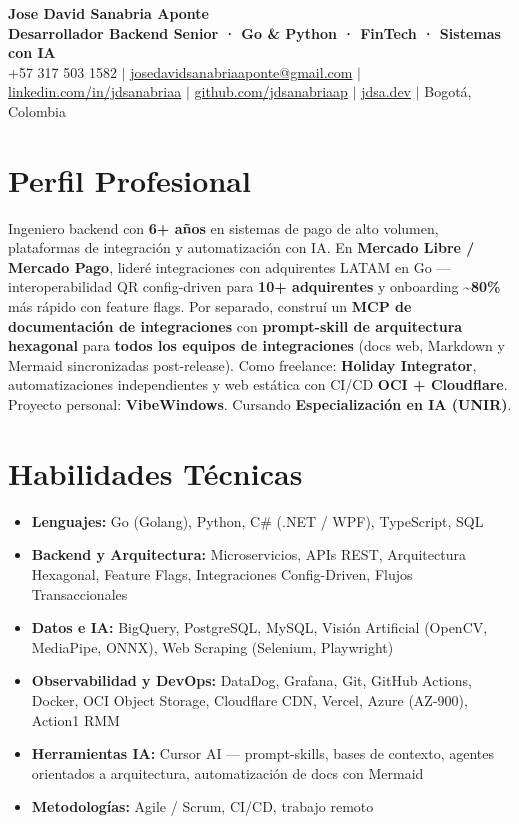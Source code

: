 
\begin{center}
  {\Huge \textbf{Jose David Sanabria Aponte}} \\[3pt]
  {\large \textcolor{accent}{\textbf{Desarrollador Backend Senior · Go \& Python · FinTech · Sistemas con IA}}} \\[4pt]
  \small
  +57 317 503 1582 \;$|$\;
  \href{mailto:josedavidsanabriaaponte@gmail.com}{josedavidsanabriaaponte@gmail.com} \;$|$\;
  \href{https://linkedin.com/in/jdsanabriaa}{linkedin.com/in/jdsanabriaa} \;$|$\;
  \href{https://github.com/jdsanabriaap}{github.com/jdsanabriaap} \;$|$\;
  \href{https://jdsa.dev}{jdsa.dev} \;$|$\;
  Bogotá, Colombia
\end{center}

\vspace{-4pt}

\section*{Perfil Profesional}

Ingeniero backend con \textbf{6+ años} en sistemas de pago de alto volumen, plataformas de integración
y automatización con IA. En \textbf{Mercado Libre / Mercado Pago}, lideré integraciones con adquirentes
LATAM en Go — interoperabilidad QR config-driven para \textbf{10+ adquirentes} y onboarding
\textbf{\textasciitilde{}80\%} más rápido con feature flags. Por separado, construí un \textbf{MCP de
documentación de integraciones} con \textbf{prompt-skill de arquitectura hexagonal} para \textbf{todos los
equipos de integraciones} (docs web, Markdown y Mermaid sincronizadas post-release). Como freelance:
\textbf{Holiday Integrator}, automatizaciones independientes y web estática con CI/CD \textbf{OCI +
Cloudflare}. Proyecto personal: \textbf{VibeWindows}. Cursando \textbf{Especialización en IA (UNIR)}.

\section*{Habilidades Técnicas}

\begin{itemize}
  \item \textbf{Lenguajes:} Go (Golang), Python, C\# (.NET / WPF), TypeScript, SQL
  \item \textbf{Backend y Arquitectura:} Microservicios, APIs REST, Arquitectura Hexagonal, Feature Flags, Integraciones Config-Driven, Flujos Transaccionales
  \item \textbf{Datos e IA:} BigQuery, PostgreSQL, MySQL, Visión Artificial (OpenCV, MediaPipe, ONNX), Web Scraping (Selenium, Playwright)
  \item \textbf{Observabilidad y DevOps:} DataDog, Grafana, Git, GitHub Actions, Docker, OCI Object Storage, Cloudflare CDN, Vercel, Azure (AZ-900), Action1 RMM
  \item \textbf{Herramientas IA:} Cursor AI — prompt-skills, bases de contexto, agentes orientados a arquitectura, automatización de docs con Mermaid
  \item \textbf{Metodologías:} Agile / Scrum, CI/CD, trabajo remoto
\end{itemize}

